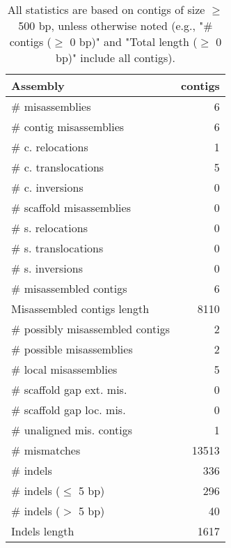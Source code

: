 \documentclass[12pt,a4paper]{article}
\begin{document}
\begin{table}[ht]
\begin{center}
\caption{All statistics are based on contigs of size $\geq$ 500 bp, unless otherwise noted (e.g., "\# contigs ($\geq$ 0 bp)" and "Total length ($\geq$ 0 bp)" include all contigs).}
\begin{tabular}{|l*{1}{|r}|}
\hline
Assembly & contigs \\ \hline
\# misassemblies & 6 \\ \hline
\hspace{2mm}\# contig misassemblies & 6 \\ \hline
\hspace{5mm}\# c. relocations & 1 \\ \hline
\hspace{5mm}\# c. translocations & 5 \\ \hline
\hspace{5mm}\# c. inversions & 0 \\ \hline
\hspace{2mm}\# scaffold misassemblies & 0 \\ \hline
\hspace{5mm}\# s. relocations & 0 \\ \hline
\hspace{5mm}\# s. translocations & 0 \\ \hline
\hspace{5mm}\# s. inversions & 0 \\ \hline
\# misassembled contigs & 6 \\ \hline
Misassembled contigs length & 8110 \\ \hline
\# possibly misassembled contigs & 2 \\ \hline
\hspace{5mm}\# possible misassemblies & 2 \\ \hline
\# local misassemblies & 5 \\ \hline
\# scaffold gap ext. mis. & 0 \\ \hline
\# scaffold gap loc. mis. & 0 \\ \hline
\# unaligned mis. contigs & 1 \\ \hline
\# mismatches & 13513 \\ \hline
\# indels & 336 \\ \hline
\hspace{5mm}\# indels ($\leq$ 5 bp) & 296 \\ \hline
\hspace{5mm}\# indels ($>$ 5 bp) & 40 \\ \hline
Indels length & 1617 \\ \hline
\end{tabular}
\end{center}
\end{table}
\end{document}
